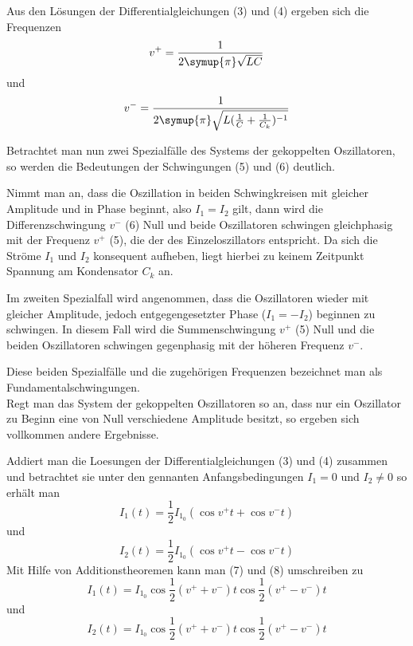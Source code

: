 Aus den Lösungen der Differentialgleichungen (3) und (4) ergeben sich die Frequenzen
\begin{equation}
    v^{+} = \frac{1}{ 2\symup{\pi} \sqrt{L C}}
    \label{eqn:Fuenf}
\end{equation}
und
\begin{equation}
    v^{-} = \frac{1}{ 2\symup{\pi} \sqrt{L (\frac{1}{C} + \frac{1}{C_k})^{-1}}}
    \label{eqn:Sechs}
\end{equation}

Betrachtet man nun zwei Spezialfälle des Systems der gekoppelten Oszillatoren, so werden die Bedeutungen der Schwingungen (5) und (6) deutlich.

Nimmt man an, dass die Oszillation in beiden Schwingkreisen mit gleicher Amplitude und in Phase beginnt, also $ I_1 = I_2 $ gilt, dann wird die Differenzschwingung $ v^{-} $ (6)
Null und beide Oszillatoren schwingen gleichphasig mit der Frequenz $ v^{+} $ (5), die der des Einzeloszillators entspricht. Da sich die Ströme $ I_1 $ und $ I_2 $ konsequent
aufheben, liegt hierbei zu keinem Zeitpunkt Spannung am Kondensator $ C_k $ an.

Im zweiten Spezialfall wird angenommen, dass die Oszillatoren wieder mit gleicher Amplitude, jedoch entgegengesetzter Phase ($ I_1 = -I_2 $) beginnen zu schwingen. In diesem Fall
wird die Summenschwingung $ v^{+} $ (5) Null und die beiden Oszillatoren schwingen gegenphasig mit der höheren Frequenz $ v^{-} $.

Diese beiden Spezialfälle und die zugehörigen Frequenzen bezeichnet man als Fundamentalschwingungen.
\\
Regt man das System der gekoppelten Oszillatoren so an, dass nur ein Oszillator zu Beginn eine von Null verschiedene Amplitude besitzt, so ergeben sich vollkommen andere Ergebnisse.

Addiert man die Loesungen der Differentialgleichungen (3) und (4) zusammen und betrachtet sie unter den gennanten Anfangsbedingungen $ I_1 = 0 $ und $ I_2 \neq 0 $ so erhält man
\begin{equation}
    I_1(t) = \frac{1}{2} I_{1_0} (\cos v^{+} t + \cos v^{-} t )
    \label{eqn:Sieben}
\end{equation}
und
\begin{equation}
    I_2(t) = \frac{1}{2} I_{1_0} (\cos v^{+} t - \cos v^{-} t )
    \label{eqn:Acht}
\end{equation}
Mit Hilfe von Additionstheoremen kann man (7) und (8) umschreiben zu
\begin{equation}
    I_1(t) = I_{1_0} \cos \frac{1}{2} (v^{+} + v^{-}) t \cos \frac{1}{2} (v^{+} - v^{-}) t
    \label{eqn:Neun}
\end{equation}
und
\begin{equation}
    I_2(t) = I_{1_0} \cos \frac{1}{2} (v^{+} + v^{-}) t \cos \frac{1}{2} (v^{+} - v^{-}) t
    \label{eqn:Zehn}
\end{equation}

